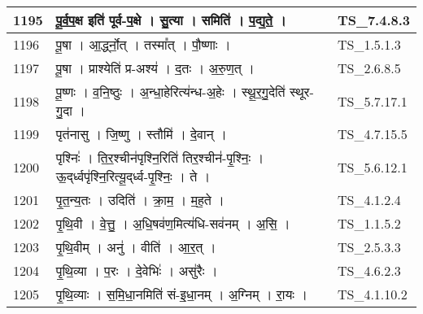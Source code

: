 \documentclass[17pt]{extarticle}
\begin{document}
\begin{longtable}{||p{0.4in}||p{4.9in}||p{0.9in}||}
    1195 & पू॒र्व॒प॒क्ष इति॑ पूर्व{-}प॒क्षे   ।   सु॒त्या   ।   समिति॑   ।   प॒द्य॒ते॒   ।    & TS\_7.4.8.3       \\
    
    \hline
        
    1196 & पू॒षा   ।   आ॒र्द्ध्नो॒त्   ।   तस्मा᳚त्   ।   पौ॒ष्णाः   ।    & TS\_1.5.1.3       \\
    
    \hline
        
    1197 & पू॒षा   ।   प्राश्येति॑ प्र{-}अश्य॑   ।   द॒तः   ।   अ॒रु॒ण॒त्   ।    & TS\_2.6.8.5       \\
    
    \hline
        
    1198 & पू॒ष्णः   ।   व॒नि॒ष्ठुः   ।   अ॒न्धा॒हेरित्य॑न्ध{-}अ॒हेः   ।   स्थू॒र॒गु॒देति॑ स्थूर{-}गु॒दा   ।    & TS\_5.7.17.1       \\
    
    \hline
        
    1199 & पृत॑नासु   ।   जि॒ष्णु   ।   स्तौमि॑   ।   दे॒वान्   ।    & TS\_4.7.15.5       \\
    
    \hline
        
    1200 & पृश्निः॑   ।   ति॒र॒श्चीन॑पृश्नि॒रिति॑ तिर॒श्चीन॑{-}पृ॒श्निः॒   ।   ऊ॒द्‌र्ध्वपृ॑श्नि॒रित्यू॒द्‌र्ध्व{-}पृ॒श्निः॒   ।   ते   ।    & TS\_5.6.12.1       \\
    
    \hline
        
    1201 & पृ॒त॒न्य॒तः   ।   उदिति॑   ।   क्रा॒म॒   ।   म॒ह॒ते   ।    & TS\_4.1.2.4       \\
    
    \hline
        
    1202 & पृ॒थि॒वी   ।   वे॒त्तु॒   ।   अ॒धि॒षव॑ण॒मित्य॑धि{-}सव॑नम्   ।   अ॒सि॒   ।    & TS\_1.1.5.2       \\
    
    \hline
        
    1203 & पृ॒थि॒वीम्   ।   अनु॑   ।   वीति॑   ।   आ॒र॒त्   ।    & TS\_2.5.3.3       \\
    
    \hline
        
    1204 & पृ॒थि॒व्या   ।   प॒रः   ।   दे॒वेभिः॑   ।   असु॑रैः   ।    & TS\_4.6.2.3       \\
    
    \hline
        
    1205 & पृ॒थि॒व्याः   ।   स॒मि॒धा॒नमिति॑ सं{-}इ॒धा॒नम्   ।   अ॒ग्निम्   ।   रा॒यः   ।    & TS\_4.1.10.2       \\
    

\end{longtable}
\end{document}
